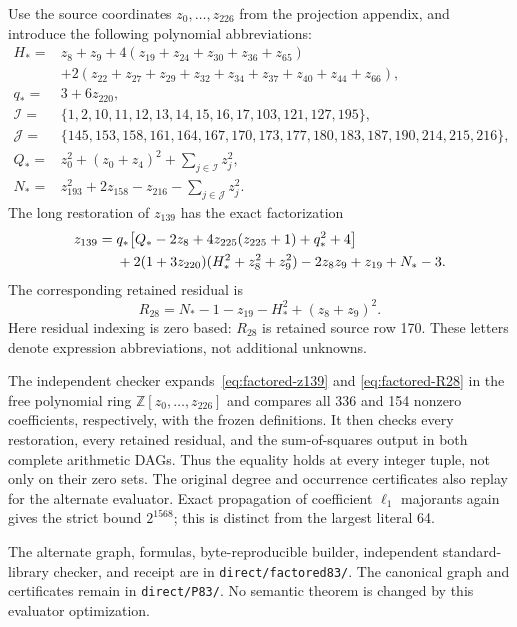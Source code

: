\documentclass[11pt]{article}
\theoremstyle{remark}
\begin{document}
Use the source coordinates $z_0,\ldots,z_{226}$ from the projection appendix,
and introduce the following polynomial abbreviations:
\begin{align*}
 H_*={}&z_8+z_9+4(z_{19}+z_{24}+z_{30}+z_{36}+z_{65})\\
       &+2(z_{22}+z_{27}+z_{29}+z_{32}+z_{34}
                    +z_{37}+z_{40}+z_{44}+z_{66}),\\
 q_*={}&3+6z_{220},\\
 \mathcal I={}&\{1,2,10,11,12,13,14,15,16,17,103,121,127,195\},\\
 \mathcal J={}&\{145,153,158,161,164,167,170,173,
                  177,180,183,187,190,214,215,216\},\\
 Q_*={}&z_0^2+(z_0+z_4)^2+\sum_{j\in\mathcal I}z_j^2,\\
 N_*={}&z_{193}^2+2z_{158}-z_{216}-\sum_{j\in\mathcal J}z_j^2.
\end{align*}
The long restoration of $z_{139}$ has the exact factorization
\begin{align}
 z_{139}={}&
 q_*\bigl[Q_*-2z_8+4z_{225}(z_{225}+1)+q_*^2+4\bigr]\notag\\
 &+2(1+3z_{220})(H_*^2+z_8^2+z_9^2)
       -2z_8z_9+z_{19}+N_*-3.\label{eq:factored-z139}
\end{align}
The corresponding retained residual is
\begin{equation}
 R_{28}=N_*-1-z_{19}-H_*^2+(z_8+z_9)^2.
 \label{eq:factored-R28}
\end{equation}
Here residual indexing is zero based: $R_{28}$ is retained source row 170.
These letters denote expression abbreviations, not additional unknowns.

The independent checker expands~\eqref{eq:factored-z139} and
\eqref{eq:factored-R28} in the free polynomial ring
$\mathbb Z[z_0,\ldots,z_{226}]$ and compares all 336 and 154 nonzero
coefficients, respectively, with the frozen definitions. It then checks
every restoration, every retained residual, and the sum-of-squares output
in both complete arithmetic DAGs. Thus the equality holds at every integer
tuple, not only on their zero sets. The original degree and occurrence
certificates also replay for the alternate evaluator. Exact propagation
of coefficient $\ell_1$ majorants again gives the strict bound $2^{1568}$;
this is distinct from the largest literal 64.

The alternate graph, formulas, byte-reproducible builder, independent
standard-library checker, and receipt are in
\texttt{direct/factored83/}. The canonical graph and certificates remain
in \texttt{direct/P83/}. No semantic theorem is changed by this evaluator
optimization.
\end{document}
